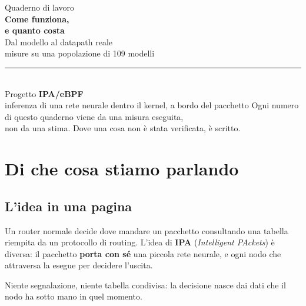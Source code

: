 \documentclass[11pt,a4paper,oneside]{report}
\begin{document}
\begin{titlepage}
\centering
\vspace*{3cm}
{\color{soft}\large Quaderno di lavoro}\\[1.2cm]
{\color{accent}\Huge\bfseries Come funziona,\\[0.3cm] e quanto costa}\\[0.9cm]
{\Large Dal modello al datapath reale}\\[0.3cm]
{\color{soft}\large misure su una popolazione di 109 modelli}\\[2.5cm]
\rule{0.6\linewidth}{0.8pt}\\[0.8cm]
{\large Progetto \textbf{IPA/eBPF}}\\[0.3cm]
{\color{soft} inferenza di una rete neurale dentro il kernel, a bordo del pacchetto}
\vfill
{\color{soft}\small Ogni numero di questo quaderno viene da una misura eseguita,\\
non da una stima. Dove una cosa non è stata verificata, è scritto.}
\end{titlepage}

\tableofcontents
\clearpage

\chapter{Di che cosa stiamo parlando}

\section{L'idea in una pagina}

Un router normale decide dove mandare un pacchetto consultando una tabella
riempita da un protocollo di routing. L'idea di \textbf{IPA} (\emph{Intelligent
PAckets}) è diversa: il pacchetto \textbf{porta con sé} una piccola rete
neurale, e ogni nodo che attraversa la esegue per decidere l'uscita.

Niente segnalazione, niente tabella condivisa: la decisione nasce dai dati che
il nodo ha sotto mano in quel momento.

\begin{center}
\end{center}
\end{document}
